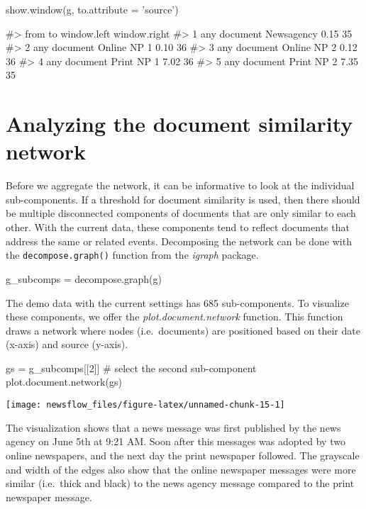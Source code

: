 \begin{Schunk}
\begin{Sinput}
show.window(g, to.attribute = 'source')
\end{Sinput}
\begin{Soutput}
#>           from          to window.left window.right
#> 1 any document  Newsagency        0.15           35
#> 2 any document Online NP 1        0.10           36
#> 3 any document Online NP 2        0.12           36
#> 4 any document  Print NP 1        7.02           36
#> 5 any document  Print NP 2        7.35           35
\end{Soutput}
\end{Schunk}

\section{Analyzing the document similarity network}

Before we aggregate the network, it can be informative to look at the
individual sub-components. If a threshold for document similarity is
used, then there should be multiple disconnected components of documents
that are only similar to each other. With the current data, these
components tend to reflect documents that address the same or related
events. Decomposing the network can be done with the
\texttt{decompose.graph()} function from the \emph{igraph} package.

\begin{Schunk}
\begin{Sinput}
g_subcomps = decompose.graph(g)
\end{Sinput}
\end{Schunk}

The demo data with the current settings has 685 sub-components. To
visualize these components, we offer the \emph{plot.document.network}
function. This function draws a network where nodes (i.e.~documents) are
positioned based on their date (x-axis) and source (y-axis).

\begin{Schunk}
\begin{Sinput}
gs = g_subcomps[[2]] # select the second sub-component
plot.document.network(gs)
\end{Sinput}

\texttt{[image: newsflow\_files/figure-latex/unnamed-chunk-15-1]} \end{Schunk}

The visualization shows that a news message was first published by the
news agency on June 5th at 9:21 AM. Soon after this messages was adopted
by two online newspapers, and the next day the print newspaper followed.
The grayscale and width of the edges also show that the online newspaper
messages were more similar (i.e.~thick and black) to the news agency
message compared to the print newspaper message.

